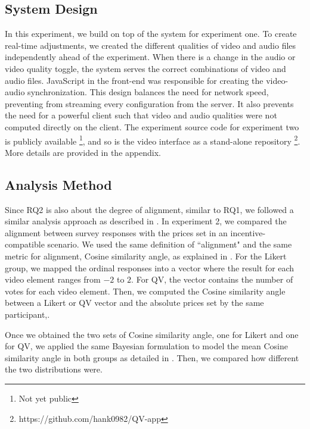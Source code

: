 \subsection{System Design}
In this experiment, we build on top of the system for experiment one. To create real-time adjustments, we created the different qualities of video and audio files independently ahead of the experiment. When there is a change in the audio or video quality toggle, the system serves the correct combinations of video and audio files. JavaScript in the front-end was responsible for creating the video-audio synchronization.
This design balances the need for network speed, preventing from streaming every configuration from the server. It also prevents the need for a powerful client such that video and audio qualities were not computed directly on the client. The experiment source code for experiment two is publicly available \footnote{Not yet public}, and so is the video interface as a stand-alone repository \footnote{https://github.com/hank0982/QV-app}. More details are provided in the appendix.

\subsection{Analysis Method}

Since RQ2 is also about the degree of alignment, similar to RQ1, we followed a similar analysis approach as described in . In experiment 2, we compared the alignment between survey responses with the prices set in an incentive-compatible scenario. We used the same definition of ``alignment" and the same metric for alignment, Cosine similarity angle, as explained in . For the Likert group, we mapped the ordinal responses into a vector where the result for each video element ranges from $-2$ to $2$. For QV, the vector contains the number of votes for each video element. Then, we computed the Cosine similarity angle between a Likert or QV vector and the absolute prices set by the same participant,.

Once we obtained the two sets of Cosine similarity angle, one for Likert and one for QV, we applied the same Bayesian formulation to model the mean Cosine similarity angle in both groups as detailed in . Then, we compared how different the two distributions were.